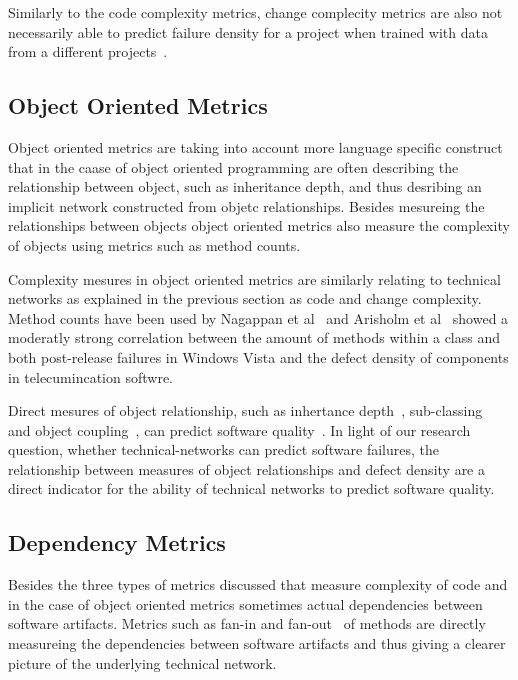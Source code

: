 Similarly to the code complexity metrics, change complecity metrics are also not necessarily able to predict failure density for a project when trained with data from a different projects~\cite{zimmermann:fse:2009}.


\subsection{Object Oriented Metrics}
\label{chap:6:sub:oom}
Object oriented metrics are taking into account more language specific construct that in the caase of object oriented programming are often describing the relationship between object, such as inheritance depth, and thus desribing an implicit network constructed from objetc relationships.
Besides mesureing the relationships between objects object oriented metrics also measure the complexity of objects using metrics such as method counts.

Complexity mesures in object oriented metrics are similarly relating to technical networks as explained in the previous section as code and change complexity.
Method counts have been used by Nagappan et al~\cite{nagappan:icse:2006} and Arisholm et al~\cite{arisholm:isese:2006} showed a moderatly strong correlation between the amount of methods within a class and both post-release failures in Windows Vista and the defect density of components in telecumincation softwre.

Direct mesures of object relationship, such as inhertance depth~\cite{chidamber:tse:1994}, sub-classing~\cite{chidamber:tse:1994} and object coupling~\cite{chidamber:tse:1994}, can predict software quality~\cite{nagappan:icse:2006,arisholm:isese:2006,english:promise:2009}.
In light of our research question, whether technical-networks can predict software failures, the relationship between measures of object relationships and defect density are a direct indicator for the ability of technical networks to predict software quality.


\subsection{Dependency Metrics}
\label{chap:6:sub:depmet}
Besides the three types of metrics discussed that measure complexity of code and in the case of object oriented metrics sometimes actual dependencies between software artifacts.
Metrics such as fan-in and fan-out~\cite{henry:tse:1981} of methods are directly measureing the dependencies between software artifacts and thus giving a clearer picture of the underlying technical network.

